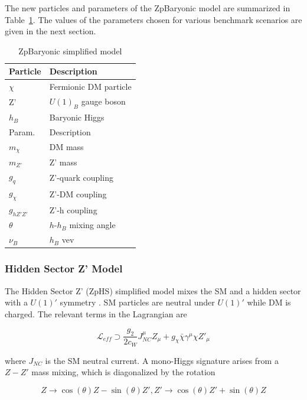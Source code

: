 The new particles and parameters of the ZpBaryonic model are summarized in Table~\ref{tab:ZpBaryonic}. The values of the parameters chosen for various benchmark scenarios are given in the next section.

\begin{table}[htbH]
\begin{center}
\begin{tabular}{ l | l}
\hline
Particle & Description \\
\hline
$\chi$ & Fermionic DM particle \\
Z' & $U(1)_B$ gauge boson \\
$h_B$ & Baryonic Higgs \\
\hline
Param. & Description \\
\hline
$m_\chi$ & DM mass \\
$m_{Z'}$ & Z' mass \\
$g_q$ & Z'-quark coupling \\
$g_\chi$ & Z'-DM coupling \\
$g_{hZ'Z'}$ & Z'-h coupling \\
$\theta$ & $h$-$h_B$ mixing angle \\
$\nu_B$ & $h_B$ vev \\
\hline
\end{tabular}
\caption{ZpBaryonic simplified model}\label{tab:ZpBaryonic}
\end{center}
\end{table}

\subsubsection{Hidden Sector Z' Model}

The Hidden Sector Z' (ZpHS) simplified model mixes the SM and a hidden sector with a $U(1)'$ symmetry \cite{Chang:2006fp, Pospelov:2007mp, Feldman:2007wj, Feng:2008mu, Gopalakrishna:2008dv}. SM particles are neutral under $U(1)'$ while DM is charged. The relevant terms in the Lagrangian are

\begin{equation}
\mathcal{L}_{eff} \supset \frac{g_2}{2c_W} J^\mu_{NC} Z_\mu + g_\chi \bar{\chi} \gamma^\mu \chi Z'_\mu
\end{equation}

where $J_{NC}$ is the SM neutral current. A mono-Higgs signature arises from a $Z-Z'$ mass mixing, which is diagonalized by the rotation

\begin{equation}
Z \rightarrow \cos(\theta) Z - \sin(\theta) Z', Z' \rightarrow \cos(\theta) Z' + \sin(\theta) Z
\end{equation}

